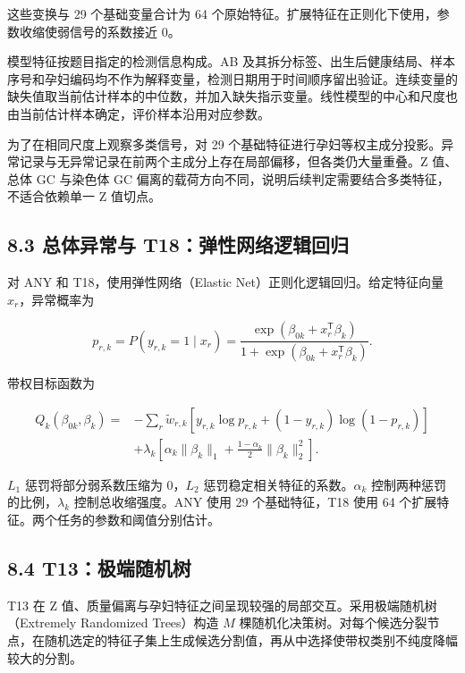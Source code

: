 \documentclass[UTF8,fontset=fandol,zihao=-4,a4paper]{ctexart}
\begin{document}
这些变换与 29 个基础变量合计为 64
个原始特征。扩展特征在正则化下使用，参数收缩使弱信号的系数接近 0。

模型特征按题目指定的检测信息构成。AB
及其拆分标签、出生后健康结局、样本序号和孕妇编码均不作为解释变量，检测日期用于时间顺序留出验证。连续变量的缺失值取当前估计样本的中位数，并加入缺失指示变量。线性模型的中心和尺度也由当前估计样本确定，评价样本沿用对应参数。

为了在相同尺度上观察多类信号，对 29 个基础特征进行孕妇等权主成分投影。异常记录与无异常记录在前两个主成分上存在局部偏移，但各类仍大量重叠。Z
值、总体 GC 与染色体 GC
偏离的载荷方向不同，说明后续判定需要结合多类特征，不适合依赖单一 Z
值切点。

\subsection{8.3 总体异常与
T18：弹性网络逻辑回归}\label{ux603bux4f53ux5f02ux5e38ux4e0e-t18ux5f39ux6027ux7f51ux7edcux903bux8f91ux56deux5f52}

对 ANY 和 T18，使用弹性网络（Elastic Net）正则化逻辑回归。给定特征向量
\(x_r\)，异常概率为

\[
p_{r,k}
=P(y_{r,k}=1\mid x_r)
=\frac{
\exp(\beta_{0k}+x_r^{\mathsf T}\beta_k)
}{
1+\exp(\beta_{0k}+x_r^{\mathsf T}\beta_k)
}.
\tag{55}
\]

带权目标函数为

\[
\begin{aligned}
Q_k(\beta_{0k},\beta_k)
={}&-\sum_r\widetilde w_{r,k}
\left[
y_{r,k}\log p_{r,k}
+(1-y_{r,k})\log(1-p_{r,k})
\right]\\
&+\lambda_k
\left[
\alpha_k\|\beta_k\|_1
+\frac{1-\alpha_k}{2}\|\beta_k\|_2^2
\right].
\end{aligned}
\tag{56}
\]

\(L_1\) 惩罚将部分弱系数压缩为 0，\(L_2\)
惩罚稳定相关特征的系数。\(\alpha_k\) 控制两种惩罚的比例，\(\lambda_k\)
控制总收缩强度。ANY 使用 29 个基础特征，T18 使用 64
个扩展特征。两个任务的参数和阈值分别估计。

\subsection{8.4
T13：极端随机树}\label{t13ux6781ux7aefux968fux673aux6811}

T13 在 Z
值、质量偏离与孕妇特征之间呈现较强的局部交互。采用极端随机树（Extremely
Randomized Trees）构造 \(M\)
棵随机化决策树。对每个候选分裂节点，在随机选定的特征子集上生成候选分割值，再从中选择使带权类别不纯度降幅较大的分割。
\end{document}
